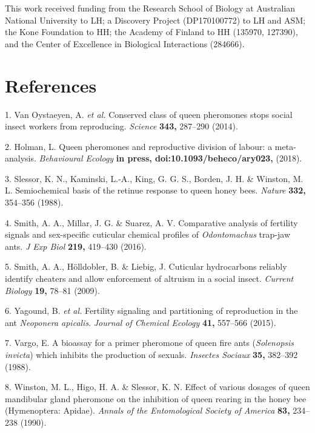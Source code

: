 \documentclass[12pt,]{article}
\begin{document}
This work received funding from the Research School of Biology at
Australian National University to LH; a Discovery Project (DP170100772)
to LH and ASM; the Kone Foundation to HH; the Academy of Finland to HH
(135970, 127390), and the Center of Excellence in Biological
Interactions (284666).

\section{References}\label{references}

\hypertarget{refs}{}
\hypertarget{ref-VanOystaeyen:2014vr}{}
1. Van Oystaeyen, A. \emph{et al.} Conserved class of queen pheromones
stops social insect workers from reproducing. \emph{Science}
\textbf{343,} 287--290 (2014).

\hypertarget{ref-Holman:2018tx}{}
2. Holman, L. Queen pheromones and reproductive division of labour: a
meta-analysis. \emph{Behavioural Ecology} \textbf{in press,
doi:10.1093/beheco/ary023,} (2018).

\hypertarget{ref-Slessor:1988cj}{}
3. Slessor, K. N., Kaminski, L.-A., King, G. G. S., Borden, J. H. \&
Winston, M. L. Semiochemical basis of the retinue response to queen
honey bees. \emph{Nature} \textbf{332,} 354--356 (1988).

\hypertarget{ref-Smith:2016dz}{}
4. Smith, A. A., Millar, J. G. \& Suarez, A. V. Comparative analysis of
fertility signals and sex-specific cuticular chemical profiles of
\emph{Odontomachus} trap-jaw ants. \emph{J Exp Biol} \textbf{219,}
419--430 (2016).

\hypertarget{ref-Smith:2009ic}{}
5. Smith, A. A., Hölldobler, B. \& Liebig, J. Cuticular hydrocarbons
reliably identify cheaters and allow enforcement of altruism in a social
insect. \emph{Current Biology} \textbf{19,} 78--81 (2009).

\hypertarget{ref-Yagound:2015ip}{}
6. Yagound, B. \emph{et al.} Fertility signaling and partitioning of
reproduction in the ant \emph{Neoponera apicalis}. \emph{Journal of
Chemical Ecology} \textbf{41,} 557--566 (2015).

\hypertarget{ref-Vargo:1988fv}{}
7. Vargo, E. A bioassay for a primer pheromone of queen fire ants
(\emph{Solenopsis invicta}) which inhibits the production of sexuals.
\emph{Insectes Sociaux} \textbf{35,} 382--392 (1988).

\hypertarget{ref-Winston:1990vi}{}
8. Winston, M. L., Higo, H. A. \& Slessor, K. N. Effect of various
dosages of queen mandibular gland pheromone on the inhibition of queen
rearing in the honey bee (Hymenoptera: Apidae). \emph{Annals of the
Entomological Society of America} \textbf{83,} 234--238 (1990).
\end{document}
